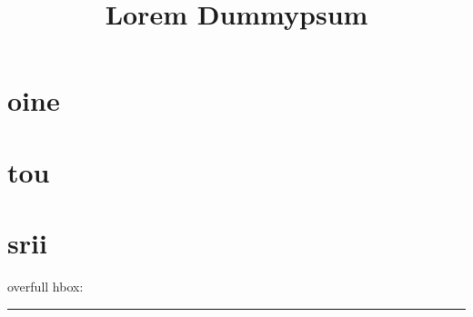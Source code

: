 \documentclass[a4paper, 12pt]{memoir}
\title{Lorem Dummypsum}
\begin{document}
\chapter{oine}

\chapter{tou}

\chapter{srii}


overfull hbox: \rule{2\textwidth}{3pt} 
\end{document}
